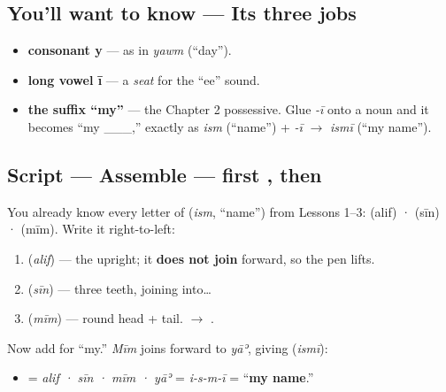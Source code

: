 \subsection*{You'll want to know — Its three jobs}
\begin{itemize}
\raggedright
  \item \textbf{consonant y} — as in \emph{yawm} (\textquotedblleft{}day\textquotedblright{}).
  \item \textbf{long vowel ī} — a \emph{seat} for the \textquotedblleft{}ee\textquotedblright{} sound.
  \item \textbf{the suffix  \textquotedblleft{}my\textquotedblright{}} — the Chapter 2 possessive. Glue \emph{-ī} onto a noun and it becomes \textquotedblleft{}my \_\_\_,\textquotedblright{} exactly as \emph{ism} (\textquotedblleft{}name\textquotedblright{}) + \emph{-ī} $\to$ \emph{ismī} (\textquotedblleft{}my name\textquotedblright{}).
\end{itemize}

\subsection*{Script — Assemble — first , then }
You already know every letter of \textbf{} (\emph{ism}, \textquotedblleft{}name\textquotedblright{}) from Lessons 1–3: \textbf{} (alif) · \textbf{} (sīn) · \textbf{} (mīm). Write it right-to-left:

\begin{enumerate}
\raggedright
  \item \textbf{} (\emph{alif}) — the upright; it \textbf{does not join} forward, so the pen lifts.
  \item \textbf{} (\emph{sīn}) — three teeth, joining into…
  \item \textbf{} (\emph{mīm}) — round head + tail. $\to$ \textbf{}.
\end{enumerate}

Now add \textbf{} for \textquotedblleft{}my.\textquotedblright{} \emph{Mīm} joins forward to \emph{yāʾ}, giving \textbf{} (\emph{ismī}):

\begin{itemize}
\raggedright
  \item \textbf{} = \emph{alif · sīn · mīm · yāʾ} = \emph{i-s-m-ī} = \textquotedblleft{}\textbf{my name}.\textquotedblright{}
\end{itemize}

